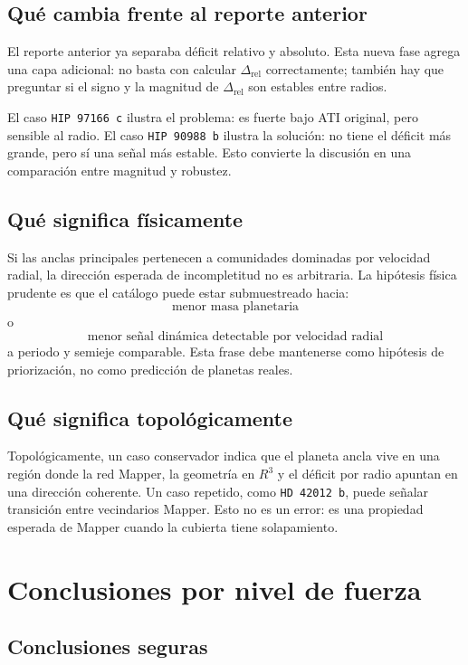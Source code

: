 \documentclass[11pt]{article}
\begin{document}
\subsection{Qué cambia frente al reporte anterior}

El reporte anterior ya separaba déficit relativo y absoluto. Esta nueva fase agrega una capa adicional: no basta con calcular $\Delta_{\mathrm{rel}}$ correctamente; también hay que preguntar si el signo y la magnitud de $\Delta_{\mathrm{rel}}$ son estables entre radios.

El caso \texttt{HIP 97166 c} ilustra el problema: es fuerte bajo ATI original, pero sensible al radio. El caso \texttt{HIP 90988 b} ilustra la solución: no tiene el déficit más grande, pero sí una señal más estable. Esto convierte la discusión en una comparación entre magnitud y robustez.

\subsection{Qué significa físicamente}

Si las anclas principales pertenecen a comunidades dominadas por velocidad radial, la dirección esperada de incompletitud no es arbitraria. La hipótesis física prudente es que el catálogo puede estar submuestreado hacia:
\[
\text{menor masa planetaria}
\]
o
\[
\text{menor señal dinámica detectable por velocidad radial}
\]
a periodo y semieje comparable. Esta frase debe mantenerse como hipótesis de priorización, no como predicción de planetas reales.

\subsection{Qué significa topológicamente}

Topológicamente, un caso conservador indica que el planeta ancla vive en una región donde la red Mapper, la geometría en $R^3$ y el déficit por radio apuntan en una dirección coherente. Un caso repetido, como \texttt{HD 42012 b}, puede señalar transición entre vecindarios Mapper. Esto no es un error: es una propiedad esperada de Mapper cuando la cubierta tiene solapamiento.

\section{Conclusiones por nivel de fuerza}

\subsection{Conclusiones seguras}
\end{document}
